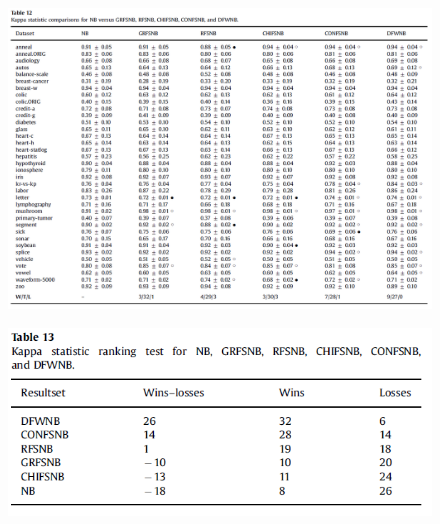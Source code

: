 \documentclass[12pt, a4paper]{article}
\begin{document}
\begin{figure}
    \centering
    \includegraphics[width=\linewidth]{images/article1/table12.png}
    \caption{}
    \label{a1_table12}
\end{figure}
\begin{figure}
    \centering
    \includegraphics[width=\linewidth]{images/article1/table13.png}
    \caption{}
    \label{a1_table13}
\end{figure}

\clearpage
\end{document}
